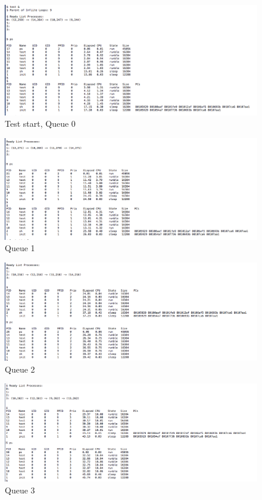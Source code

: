 \documentclass[11pt,letterpaper]{report}
\begin{document}
\begin{figure}[h]
\centering
\includegraphics[width=0.8\linewidth]{demotion-0.png}
\caption{Test start, Queue 0}
\label{fig:1}
\end{figure}

\begin{figure}[h]
\centering
\includegraphics[width=0.8\linewidth]{demotion-1.png}
\caption{Queue 1}
\label{fig:3}
\end{figure}

\newpage

\begin{figure}[h]
\centering
\includegraphics[width=0.8\linewidth]{demotion-2.png}
\caption{Queue 2}
\label{fig:4}
\end{figure}

\begin{figure}[h]
\centering
\includegraphics[width=0.6\linewidth]{demotion-3.png}
\caption{Queue 3}
\label{fig:5}
\end{figure}
\end{document}
